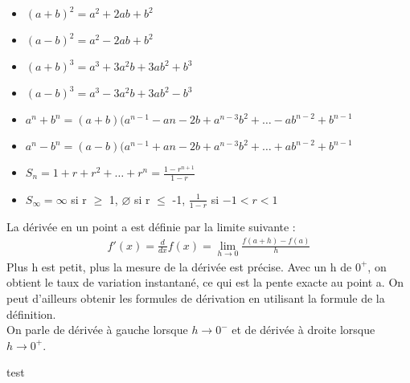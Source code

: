 \documentclass[10pt, french]{article}
\begin{document}
\begin{multicols*}{2}
\begin{definitionNOHFILLsub}
  \begin{itemize}
    \item $(a+b)^{2} = a^{2} + 2ab + b^{2}$
    \item $(a-b)^{2} = a^{2} - 2ab + b^{2}$
    \item $(a+b)^{3} = a^{3} + 3a^{2}b + 3ab^{2} + b^{3}$
    \item $(a-b)^{3} = a^{3} - 3a^{2}b + 3ab^{2} - b^{3}$
    \item $a^{n}+b^{n} = (a+b)(a^{n-1}-a{n-2}b+a^{n-3}b^{2}+ \dots -ab^{n-2}+b^{n-1}$
    \item $a^{n}-b^{n} = (a-b)(a^{n-1}+a{n-2}b+a^{n-3}b^{2}+ \dots +ab^{n-2}+b^{n-1}$
    \item $S_{n} = 1+r+r^{2}+ \dots +r^{n}=\frac{1-r^{n+1}}{1-r}$
    \item $S_{\infty} = \infty$ si r $\geq$ 1, $\varnothing$ si r $\leq$ -1, $\frac{1}{1-r}$ si $-1 < r < 1$
  \end{itemize}
\end{definitionNOHFILLsub}

\begin{definitionNOHFILLsub}
  La dérivée en un point a est définie par la limite suivante :\\
  \begin{align*}
    f'(x)=\frac{d}{dx} f(x)=\lim_{h \to 0} \frac{f(a+h)-f(a)}{h}
  \end{align*}
  Plus h est petit, plus la mesure de la dérivée est précise. Avec un h de $0^{+}$, on obtient le taux de variation instantané, ce qui est la pente exacte au point a. On peut d'ailleurs obtenir les formules de dérivation en utilisant la formule de la définition.\\
  On parle de dérivée à gauche lorsque $h \to 0^{-}$ et de dérivée à droite lorsque $h \to 0^{+}$.
  
\end{definitionNOHFILLsub}

\begin{definitionNOHFILLsub}
 test
  
\end{definitionNOHFILLsub}

\end{multicols*}
\end{document}
